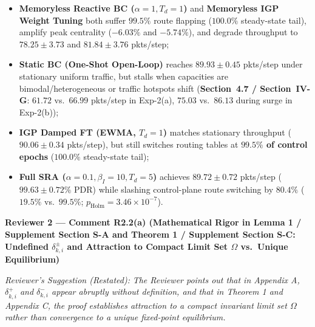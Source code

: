 \documentclass[11pt,a4paper]{article}
\newcommand{\cbox}[2]{%
  \vspace{0.6em}\noindent\textbf{#1}\par\smallskip
  \noindent\textit{Reviewer's Suggestion (Restated):} \textit{#2}\par\smallskip
}
\begin{document}
\begin{enumerate}[leftmargin=1.8em]
    \begin{itemize}
        \item \textbf{Memoryless Reactive BC ($\alpha=1, T_d=1$)} and \textbf{Memoryless IGP Weight Tuning} both suffer $99.5\%$ route flapping ($100.0\%$ steady-state tail), amplify peak centrality ($-6.03\%$ and $-5.74\%$), and degrade throughput to $78.25 \pm 3.73$ and $81.84 \pm 3.76$ pkts/step;
        \item \textbf{Static BC (One-Shot Open-Loop)} reaches $89.93 \pm 0.45$ pkts/step under stationary uniform traffic, but stalls when capacities are bimodal/heterogeneous or traffic hotspots shift (\textbf{Section~4.7 / Section~IV-G}: $61.72$ vs.\ $66.99$ pkts/step in Exp-2(a), $75.03$ vs.\ $86.13$ during surge in Exp-2(b));
        \item \textbf{IGP Damped FT (EWMA, $T_d=1$)} matches stationary throughput ($90.06 \pm 0.34$ pkts/step), but still switches routing tables at \textbf{$99.5\%$ of control epochs} ($100.0\%$ steady-state tail);
        \item \textbf{Full SRA ($\alpha=0.1, \beta_I=10, T_d=5$)} achieves $89.72 \pm 0.72$ pkts/step ($99.63 \pm 0.72\%$ PDR) while slashing control-plane route switching by \textbf{$80.4\%$} ($19.5\%$ vs.\ $99.5\%$; $p_{\text{Holm}}=3.46 \times 10^{-7}$).
    \end{itemize}
\end{enumerate}

\hrulefill

\cbox{Reviewer 2 --- Comment R2.2(a) (Mathematical Rigor in Lemma 1 / Supplement Section S-A and Theorem 1 / Supplement Section S-C: Undefined $\delta^\pm_{k,i}$ and Attraction to Compact Limit Set $\Omega$ vs.\ Unique Equilibrium)}{The Reviewer points out that in Appendix A, $\delta^+_{k,i}$ and $\delta^-_{k,i}$ appear abruptly without definition, and that in Theorem 1 and Appendix C, the proof establishes attraction to a compact invariant limit set $\Omega$ rather than convergence to a unique fixed-point equilibrium.}
\end{document}
